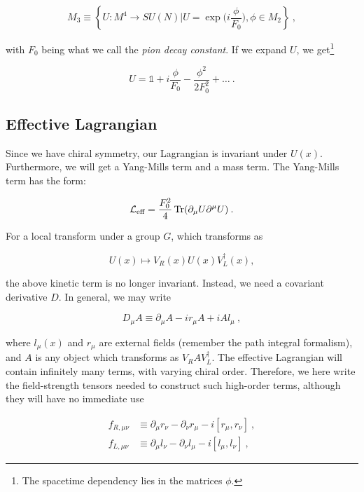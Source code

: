 \documentclass[10pt,twoside]{report}
\begin{document}
	\begin{equation}
		M_3 \equiv \left\{ U:M^4 \rightarrow SU(N)| U=\exp\big(i\frac{\phi}{F_0}\big), \phi\in M_2 \right\} \:,
	\end{equation}
	
	\noindent with $F_0$ being what we call the \emph{pion decay constant}. If we expand $U$, we get\footnote{The spacetime dependency lies in the matrices $\phi$.}
	
	\begin{equation}
		U = \mathds{1} + i\frac{\phi}{F_0} - \frac{\phi^2}{2F_0^2} + \ldots \:.
	\end{equation}
	
	\subsection{Effective Lagrangian}
	Since we have chiral symmetry, our Lagrangian is invariant under $U(x)$. Furthermore, we will get a Yang-Mills term and a mass term. The Yang-Mills term has the form:
	
	\begin{equation}
		\mathcal{L}_{\text{eff}} = \frac{F_0^2}{4}\operatorname{Tr} (\partial_\mu U \partial^\mu U) \:.
	\end{equation}
	
	For a local transform under a group $G$, which transforms as
	
	\begin{equation}
		U(x) \mapsto V_R(x)U(x)V_L^\dagger(x),
	\end{equation}
	
	\noindent the above kinetic term is no longer invariant. Instead, we need a covariant derivative $D$. In general, we may write
	
	\begin{equation}
		D_\mu A \equiv \partial_\mu A - ir_\mu A + iAl_\mu \:,
	\end{equation}
	
	\noindent where $l_\mu(x)$ and $r_\mu$ are external fields (remember the path integral formalism), and $A$ is any object which transforms as $V_RAV_L^\dagger$. The effective Lagrangian will contain infinitely many terms, with varying chiral order. Therefore, we here write the field-strength tensors needed to construct such high-order terms, although they will have no immediate use
	
	\begin{align}
		f_{R,\mu\nu} &\equiv \partial_\mu r_\nu - \partial_\nu r_\mu - i[r_\mu,r_\nu] \:, \\
		f_{L,\mu\nu} &\equiv \partial_\mu l_\nu - \partial_\nu l_\mu - i[l_\mu,l_\nu] \:,
	\end{align}
	
\end{document}
